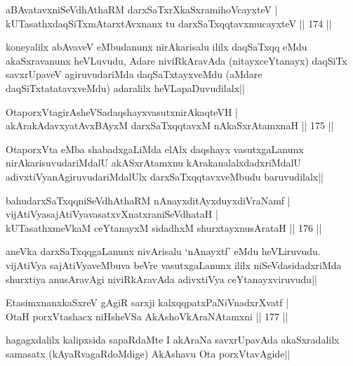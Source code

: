 \begin{shl}
aBAvatavxniSeVdhAthaRM darxSaTxrXkaSxramihoVcayxteV |\\
kUTasathxdaqSiTxmAtarxtAvxnanx tu darxSaTxqqtavxmucayxteV \hfill || 174 ||
\end{shl}

\begin{artha}
koneyalilx abAvaveV eMbudanunx nirAkarisalu ililx daqSaTxqq eMdu akaSxravanunx heVLuvudu, Adare niviRkAravAda (nitayxceYtanayx) daqSiTx savxrUpaveV agiruvudariMda daqSaTxtayxveMdu (aMdare daqSiTxtatatavxveMdu) adaralilx heVLapaDuvudilalx||
\end{artha}

\begin{shl}
OtaporxVtagirA\s sheVSadaqshayxvasutxnirAkaqteVH |\\
akArakAdavxyatAvxBAyxM darxSaTxqqtavxM nAkaSxrAtamxnaH \hfill || 175 ||
\end{shl}

\begin{artha}
OtaporxVta eMba shabadxgaLiMda elAlx daqshayx vasutxgaLanunx nirAkarisuvudariMdalU akASxrAtamxnu kArakanalalxdadxriMdalU adivxtiVyanAgiruvudariMdalUlx darxSaTxqqtavxveMbudu baruvudilalx||
\end{artha}


\begin{shl}
bahudarxSaTxqqniSeVdhAthaRM nAnayxditAyxduyxdiVraNamf |\\
vijAtiVyasajAtiVyavasatxvXnatxraniSeVdhataH |\\
kUTasathxmeVkaM ceYtanayxM sidadhxM shurxtayxnusArataH \hfill || 176 ||
\end{shl}

\begin{artha}
aneVka darxSaTxqqgaLanunx nivArisalu `nAnayxtf' eMdu heVLiruvudu. vijAtiVya sajAtiVyaveMbuva beVre vasutxgaLanunx ililx niSeVdasidadxriMda shurxtiya anusAravAgi niviRkAravAda adivxtiVya ceYtanayxviruvudu||
\end{artha}

\begin{shl}
EtasimxnanxkaSxreV gAgiR sarxji kalxqqpatxPaNiVnadxrXvatf |\\
OtaH porxVtashacx niHsheVSa AkAshoV\s kAraNAtamxni \hfill || 177 ||
\end{shl}

\begin{artha}
hagagxdalilx kalipxsida sapaRdaMte I akAraNa savxrUpavAda akaSxradalilx samasatx (kAyaRvagaRdoMdige) AkAshavu Ota porxVtavAgide||
\end{artha}

